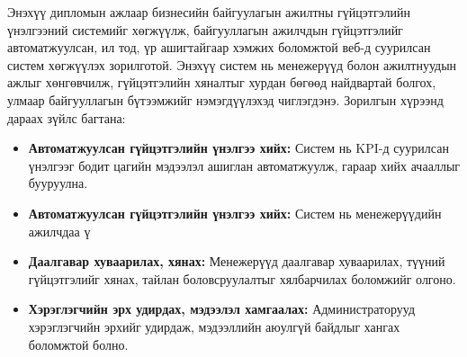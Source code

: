 Энэхүү дипломын ажлаар бизнесийн байгуулагын ажилтны гүйцэтгэлийн үнэлгээний системийг хөгжүүлж, 
байгууллагын ажилчдын гүйцэтгэлийг автоматжуулсан, ил тод, үр ашигтайгаар хэмжих боломжтой веб-д 
суурилсан систем хөгжүүлэх зорилготой. Энэхүү систем нь менежерүүд болон ажилтнуудын ажлыг хөнгөвчилж, 
гүйцэтгэлийн хяналтыг хурдан бөгөөд найдвартай болгох, улмаар байгууллагын бүтээмжийг нэмэгдүүлэхэд чиглэгдэнэ.
Зорилгын хүрээнд дараах зүйлс багтана:
\begin{itemize}
    \item \textbf{Автоматжуулсан гүйцэтгэлийн үнэлгээ хийх:} Систем нь KPI-д суурилсан үнэлгээг бодит цагийн мэдээлэл ашиглан автоматжуулж, гараар хийх ачааллыг бууруулна.
    \item \textbf{Автоматжуулсан гүйцэтгэлийн үнэлгээ хийх:} Систем нь менежерүүдийн ажилчдаа ү
    \item \textbf{Даалгавар хуваарилах, хянах:} Менежерүүд даалгавар хуваарилах, түүний гүйцэтгэлийг хянах, тайлан боловсруулалтыг хялбарчилах боломжийг олгоно.
    \item \textbf{Хэрэглэгчийн эрх удирдах, мэдээлэл хамгаалах:} Администраторууд хэрэглэгчийн эрхийг удирдаж, мэдээллийн аюулгүй байдлыг хангах боломжтой болно.
\end{itemize}